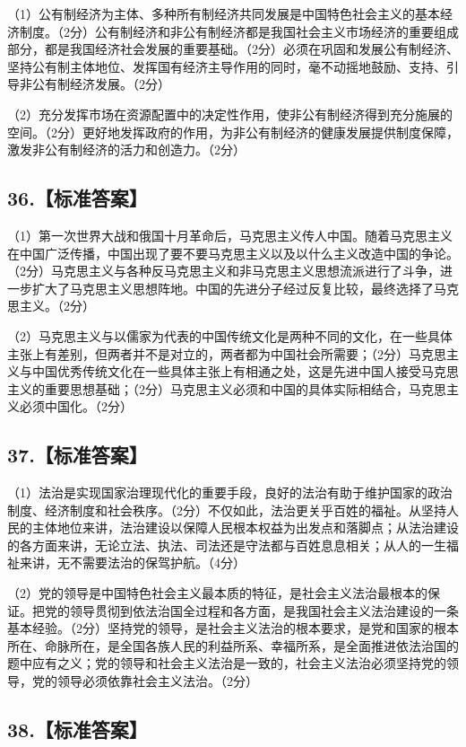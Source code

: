 \documentclass[UTF8,11pt]{ctexart}
\begin{document}
（1）公有制经济为主体、多种所有制经济共同发展是中国特色社会主义的基本经济制度。（2分）公有制经济和非公有制经济都是我国社会主义市场经济的重要组成部分，都是我国经济社会发展的重要基础。（2分）必须在巩固和发展公有制经济、坚持公有制主体地位、发挥国有经济主导作用的同时，毫不动摇地鼓励、支持、引导非公有制经济发展。（2分）


（2）充分发挥市场在资源配置中的决定性作用，使非公有制经济得到充分施展的空间。（2分）更好地发挥政府的作用，为非公有制经济的健康发展提供制度保障，激发非公有制经济的活力和创造力。（2分）


\subsection*{36.【标准答案】}

（1）第一次世界大战和俄国十月革命后，马克思主义传人中国。随着马克思主义在中国广泛传播，中国出现了要不要马克思主义以及以什么主义改造中国的争论。（2分）马克思主义与各种反马克思主义和非马克思主义思想流派进行了斗争，进一步扩大了马克思主义思想阵地。中国的先进分子经过反复比较，最终选择了马克思主义。（2分）


（2）马克思主义与以儒家为代表的中国传统文化是两种不同的文化，在一些具体主张上有差别，但两者并不是对立的，两者都为中国社会所需要；（2分）马克思主义与中国优秀传统文化在一些具体主张上有相通之处，这是先进中国人接受马克思主义的重要思想基础；（2分）马克思主义必须和中国的具体实际相结合，马克思主义必须中国化。（2分）


\subsection*{37.【标准答案】}

（1）法治是实现国家治理现代化的重要手段，良好的法治有助于维护国家的政治制度、经济制度和社会秩序。（2分）不仅如此，法治更关乎百姓的福祉。从坚持人民的主体地位来讲，法治建设以保障人民根本权益为出发点和落脚点；从法治建设的各方面来讲，无论立法、执法、司法还是守法都与百姓息息相关；从人的一生福祉来讲，无不需要法治的保驾护航。（4分）


（2）党的领导是中国特色社会主义最本质的特征，是社会主义法治最根本的保证。把党的领导贯彻到依法治国全过程和各方面，是我国社会主义法治建设的一条基本经验。（2分）坚持党的领导，是社会主义法治的根本要求，是党和国家的根本所在、命脉所在，是全国各族人民的利益所系、幸福所系，是全面推进依法治国的题中应有之义；党的领导和社会主义法治是一致的，社会主义法治必须坚持党的领导，党的领导必须依靠社会主义法治。（2分）


\subsection*{38.【标准答案】}
\end{document}
